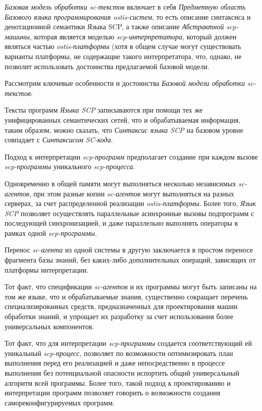 \begin{SCn}
	\begin{scnindent}
	\end{scnindent}
\end{SCn}

\textit{Базовая модель обработки sc-текстов} включает в себя \textit{Предметную область Базового языка программирования ostis-систем}, то есть описание синтаксиса и денотационной семантики Языка SCP, а также описание \textit{Абстрактной scp-машины}, которая является моделью \textit{scp-интерпретатора}, который должен являться частью \textit{ostis-платформы} (хотя в общем случае могут существовать варианты платформы, не содержащие такого интерпретатора, что, однако, не позволит использовать достоинства предлагаемой базовой модели.

Рассмотрим ключевые особенности и достоинства \textit{Базовой модели обработки sc-текстов}:
\begin{textitemize}
	\item Тексты программ \textit{Языка SCP} записываются при помощи тех же унифицированных семантических сетей, что и обрабатываемая информация, таким образом, можно сказать, что \textit{Синтаксис языка SCP} на базовом уровне совпадает с \textit{Синтаксисом SC-кода}.\item Подход к интерпретации \textit{scp-программ} предполагает создание при	каждом вызове \textit{scp-программы} уникального \textit{scp-процесса}.
	\item Одновременно в общей памяти могут выполняться несколько независимых \textit{sc-агентов}, при этом разные копии \textit{sc-агентов} могут выполняться на разных серверах, за счет распределенной реализации \textit{ostis-платформы}. Более того, \textit{Язык SCP} позволяет осуществлять параллельные асинхронные вызовы подпрограмм с последующей синхронизацией, и даже параллельно	выполнять операторы в рамках одной \textit{scp-программы}.
	\item Перенос \textit{sc-агента} из одной системы в другую заключается в простом переносе фрагмента базы знаний, без каких-либо дополнительных операций, зависящих от платформы интерпретации.
	\item Тот факт, что спецификации \textit{sc-агентов} и их программы могут быть записаны на том же языке, что и обрабатываемые знания, существенно сокращает перечень специализированных средств, предназначенных для проектирования машин обработки знаний, и упрощает их разработку за
	счет использования более универсальных компонентов.
	\item Тот факт, что для интерпретации \textit{scp-программы} создается соответствующий ей уникальный \textit{\mbox{scp-процесс}}, позволяет по возможности оптимизировать план выполнения перед его реализацией и
	даже непосредственно в процессе выполнения без потенциальной опасности испортить общий универсальный алгоритм всей программы. Более того, такой подход к проектированию и интерпретации программ позволяет говорить о возможности создания самореконфигурируемых программ.
\end{textitemize}

